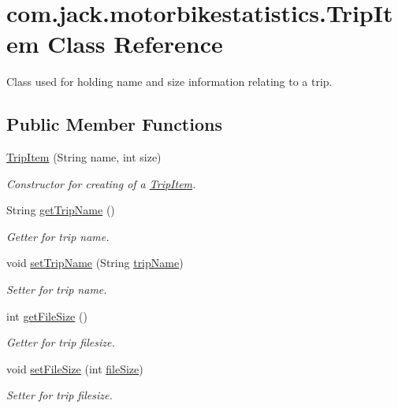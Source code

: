 \hypertarget{classcom_1_1jack_1_1motorbikestatistics_1_1_trip_item}{}\section{com.\+jack.\+motorbikestatistics.\+Trip\+Item Class Reference}
\label{classcom_1_1jack_1_1motorbikestatistics_1_1_trip_item}


Class used for holding name and size information relating to a trip.  


\subsection*{Public Member Functions}
\begin{DoxyCompactItemize}
\item 
\hyperlink{classcom_1_1jack_1_1motorbikestatistics_1_1_trip_item_a17a6df81af0062b7bf03babb4c7433b0}{Trip\+Item} (String name, int size)
\begin{DoxyCompactList}\small\item\em Constructor for creating of a \hyperlink{classcom_1_1jack_1_1motorbikestatistics_1_1_trip_item}{Trip\+Item}. \end{DoxyCompactList}\item 
String \hyperlink{classcom_1_1jack_1_1motorbikestatistics_1_1_trip_item_a0416f27a3fcd2344fca453f7a2a6b4d0}{get\+Trip\+Name} ()
\begin{DoxyCompactList}\small\item\em Getter for trip name. \end{DoxyCompactList}\item 
void \hyperlink{classcom_1_1jack_1_1motorbikestatistics_1_1_trip_item_a359fbbbde7fde3af75379054c87cfb2d}{set\+Trip\+Name} (String \hyperlink{classcom_1_1jack_1_1motorbikestatistics_1_1_trip_item_a2e678c328ae2972516c2da9d21826359}{trip\+Name})
\begin{DoxyCompactList}\small\item\em Setter for trip name. \end{DoxyCompactList}\item 
int \hyperlink{classcom_1_1jack_1_1motorbikestatistics_1_1_trip_item_aec0e07444e68e4492daa734bf3d6e24a}{get\+File\+Size} ()
\begin{DoxyCompactList}\small\item\em Getter for trip filesize. \end{DoxyCompactList}\item 
void \hyperlink{classcom_1_1jack_1_1motorbikestatistics_1_1_trip_item_a133ad3b07e6c5d57203ffdc81f6a51fc}{set\+File\+Size} (int \hyperlink{classcom_1_1jack_1_1motorbikestatistics_1_1_trip_item_ac7b1106a5db61eb17cfd3f314a885a3d}{file\+Size})
\begin{DoxyCompactList}\small\item\em Setter for trip filesize. \end{DoxyCompactList}\end{DoxyCompactItemize}
